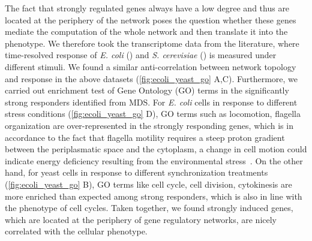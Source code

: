 The fact that strongly regulated genes always have a low degree and thus are
located at the periphery of the network poses the question whether these genes
mediate the computation of the whole network and then translate it into the 
phenotype. We therefore took the transcriptome data from the literature,
where time-resolved response of \emph{E. coli} (\citealp{Jozefczuk2010}) and 
\emph{S. cerevisiae} (\citealp{Spellman1998,Cho1998}) is 
measured under different stimuli. We found a similar anti-correlation between
network topology and response in the above datasets (\ref{fig:ecoli_yeast_go} A,C). Furthermore, we
carried out enrichment test of Gene Ontology (GO) terms in the significantly 
strong responders identified from MDS. 
For \emph{E. coli} cells in response
to different stress conditions (\ref{fig:ecoli_yeast_go} D), GO terms such as 
locomotion, flagella organization
are over-represented in the strongly responding genes, which is in accordance
to the fact that flagella motility requires a steep proton gradient between 
the periplasmatic space and the cytoplasm, a change in cell motion could 
indicate energy deficiency resulting from the environmental stress~\citep{Jozefczuk2010}. 
On the other hand, for yeast cells in response to different synchronization
treatments (\ref{fig:ecoli_yeast_go} B), GO terms like cell cycle, cell division, cytokinesis are more 
enriched than expected among strong responders, which is also in line with the
phenotype of cell cycles. Taken together, we found strongly induced genes, 
which are located at the periphery of gene regulatory networks, are nicely
correlated with the cellular phenotype.


